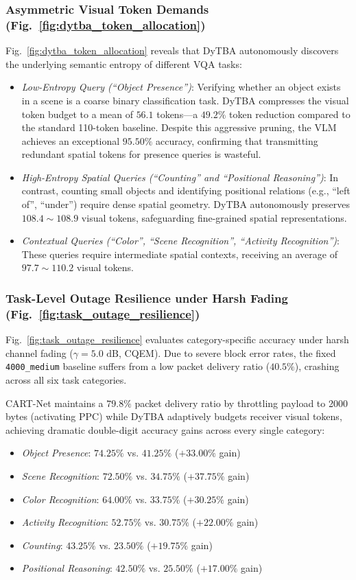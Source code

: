 \subsubsection{Asymmetric Visual Token Demands (Fig.~\ref{fig:dytba_token_allocation})}
Fig.~\ref{fig:dytba_token_allocation} reveals that DyTBA autonomously discovers the underlying semantic entropy of different VQA tasks:
\begin{itemize}
    \item \textit{Low-Entropy Query (``Object Presence'')}: Verifying whether an object exists in a scene is a coarse binary classification task. DyTBA compresses the visual token budget to a mean of $56.1$ tokens---a $49.2\%$ token reduction compared to the standard 110-token baseline. Despite this aggressive pruning, the VLM achieves an exceptional $95.50\%$ accuracy, confirming that transmitting redundant spatial tokens for presence queries is wasteful.
    \item \textit{High-Entropy Spatial Queries (``Counting'' and ``Positional Reasoning'')}: In contrast, counting small objects and identifying positional relations (e.g., ``left of'', ``under'') require dense spatial geometry. DyTBA autonomously preserves $108.4 \sim 108.9$ visual tokens, safeguarding fine-grained spatial representations.
    \item \textit{Contextual Queries (``Color'', ``Scene Recognition'', ``Activity Recognition'')}: These queries require intermediate spatial contexts, receiving an average of $97.7 \sim 110.2$ visual tokens.
\end{itemize}

\subsubsection{Task-Level Outage Resilience under Harsh Fading (Fig.~\ref{fig:task_outage_resilience})}
Fig.~\ref{fig:task_outage_resilience} evaluates category-specific accuracy under harsh channel fading ($\gamma = 5.0\text{ dB}$, CQEM). Due to severe block error rates, the fixed \texttt{4000\_medium} baseline suffers from a low packet delivery ratio ($40.5\%$), crashing across all six task categories. 

CART-Net maintains a $79.8\%$ packet delivery ratio by throttling payload to 2000 bytes (activating PPC) while DyTBA adaptively budgets receiver visual tokens, achieving dramatic double-digit accuracy gains across every single category:
\begin{itemize}
    \item \textit{Object Presence}: $74.25\%$ vs. $41.25\%$ ($+33.00\%$ gain)
    \item \textit{Scene Recognition}: $72.50\%$ vs. $34.75\%$ ($+37.75\%$ gain)
    \item \textit{Color Recognition}: $64.00\%$ vs. $33.75\%$ ($+30.25\%$ gain)
    \item \textit{Activity Recognition}: $52.75\%$ vs. $30.75\%$ ($+22.00\%$ gain)
    \item \textit{Counting}: $43.25\%$ vs. $23.50\%$ ($+19.75\%$ gain)
    \item \textit{Positional Reasoning}: $42.50\%$ vs. $25.50\%$ ($+17.00\%$ gain)
\end{itemize}

